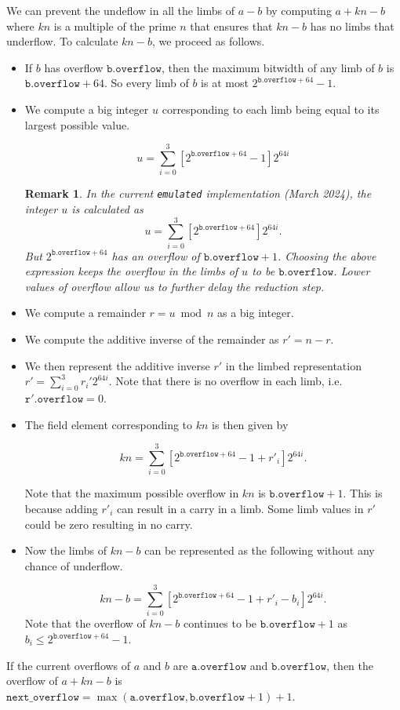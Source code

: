 \documentclass[a4paper, 12pt]{article}
\newtheorem*{remark}{Remark}
\begin{document}
We can prevent the undeflow in all the limbs of $a-b$ by computing $a+kn-b$ where $kn$ is a multiple of the prime $n$ that ensures that $kn-b$ has no limbs that underflow.  To calculate $kn-b$, we proceed as follows.
\begin{itemize}
  \item If $b$ has overflow $\texttt{b.overflow}$, then the maximum bitwidth of any limb of $b$ is $\texttt{b.overflow}+64$. So every limb of $b$ is at most $2^{\texttt{b.overflow}+64}-1$.
  \item  We compute a big integer $u$ corresponding to each limb being equal to its largest possible value.

    $$u = \sum_{i=0}^{3} \left[2^{\texttt{b.overflow}+ 64} - 1 \right] 2^{64i}$$

    \begin{remark}
    In the current \texttt{emulated} implementation (March 2024), the integer $u$ is calculated as $$u = \sum_{i=0}^{3} \left[2^{\texttt{b.overflow}+ 64} \right] 2^{64i}.$$ But $2^{\texttt{b.overflow}+ 64}$ has an overflow of $\texttt{b.overflow}+1$. Choosing the above expression keeps the overflow in the limbs of $u$ to be $\texttt{b.overflow}$. Lower values of overflow allow us to further delay the reduction step.
    \end{remark}

  \item  We compute a remainder $r = u \bmod n$ as a big integer.
  \item  We compute the additive inverse of the remainder as $r' = n - r$.
  \item  We then represent the additive inverse $r'$ in the limbed representation $r' = \sum_{i=0}^3 r_i' 2^{64i}$. Note that there is no overflow in each limb, i.e.~$\texttt{r}'.\texttt{overflow} = 0$.
  \item  The field element corresponding to $kn$ is then given by

    $$kn = \sum_{i=0}^{3} \left[2^{\texttt{b.overflow}+ 64} - 1 + r'_i\right] 2^{64i}.$$
    
    Note that the maximum possible overflow in $kn$ is $\texttt{b.overflow}+1$.  This is because adding $r'_i$ can result in a carry in a limb. Some limb values in $r'$ could be zero resulting in no carry.

  \item  Now the limbs of $kn-b$ can be represented as the following without any chance of underflow.

    $$kn-b = \sum_{i=0}^{3} \left[2^{\texttt{b.overflow}+ 64} -1 + r'_i- b_i\right] 2^{64i}.$$
    Note that the overflow of $kn-b$ continues to be  $\texttt{b.overflow}+1$ as $b_i \le 2^{\texttt{b.overflow}+ 64}-1$.

\end{itemize}
If the current overflows of $a$ and $b$ are $\texttt{a.overflow}$ and $\texttt{b.overflow}$, then the overflow of $a+kn-b$ is $\texttt{next\_overflow} = \max(\texttt{a.overflow}, \texttt{b.overflow}+1) + 1$.
\end{document}
